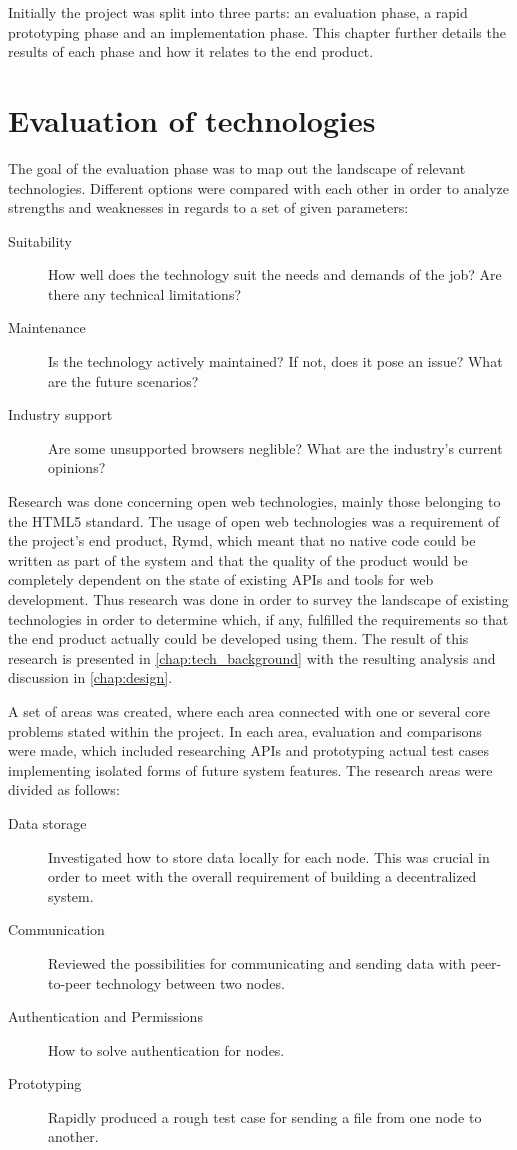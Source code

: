 Initially the project was split into three parts: an evaluation phase, a rapid prototyping phase and an implementation phase. This chapter further details the results of each phase and how it relates to the end product.

\section{Evaluation of technologies}

The goal of the evaluation phase was to map out the landscape of relevant technologies. Different options were compared  with each other in order to analyze strengths and weaknesses in regards to a set of given parameters:

\begin{description}
  \item[Suitability] How well does the technology suit the needs and demands of the job? Are there any technical limitations?
  \item[Maintenance] Is the technology actively maintained? If not, does it pose an issue? What are the future scenarios?
  \item[Industry support] Are some unsupported browsers neglible? What are the industry's current opinions?
\end{description}

Research was done concerning open web technologies, mainly those belonging to the HTML5 standard. The usage of open web technologies was a requirement of the project's end product, Rymd, which meant that no native code could be written as part of the system and that the quality of the product would be completely dependent on the state of existing APIs and tools for web development. Thus research was done in order to survey the landscape of existing technologies in order to determine which, if any, fulfilled the requirements so that the end product actually could be developed using them. The result of this research is presented in \ref{chap:tech_background} with the resulting analysis and discussion in \ref{chap:design}.

A set of areas was created, where each area connected with one or several core problems stated within the project. In each area, evaluation and comparisons were made, which included researching APIs and prototyping actual test cases implementing isolated forms of future system features. The research areas were divided as follows:

\begin{description}
\item[Data storage] Investigated how to store data locally for each node. This was crucial in order to meet with the overall requirement of building a decentralized system.
\item[Communication] Reviewed the possibilities for communicating and sending data with peer-to-peer technology between two nodes.
\item[Authentication and Permissions] How to solve authentication for nodes.
\item[Prototyping] Rapidly produced a rough test case for sending a file from one node to another.
\end{description}


